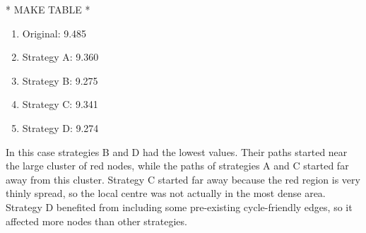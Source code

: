 \documentclass[12pt,a4paper]{report}
\begin{document}
* MAKE TABLE *

\begin{enumerate}
    \item Original: 9.485
    \item Strategy A: 9.360
    \item Strategy B: 9.275
    \item Strategy C: 9.341
    \item Strategy D: 9.274
\end{enumerate}

In this case strategies B and D had the lowest values. Their paths started near the large cluster of red nodes, while the paths of strategies A and C started far away from this cluster. Strategy C started far away because the red region is very thinly spread, so the local centre was not actually in the most dense area. Strategy D benefited from including some pre-existing cycle-friendly edges, so it affected more nodes than other strategies.
\end{document}
